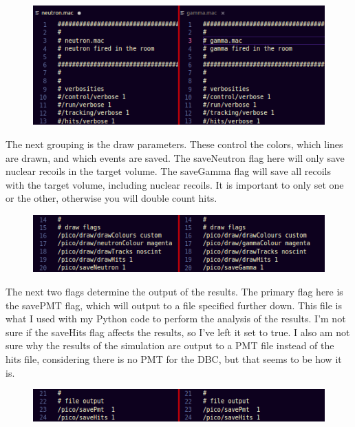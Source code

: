 \documentclass[%
12pt,
twoside,
reprint,
amsmath,amssymb,
aps,
]{article}
\begin{document}
	\begin{figure}[!h]
		\centering
		\includegraphics[scale = 1]{Images/verbosities.png}
		\caption{\label{tab:table-name}}
	\end{figure}

	\noindent The next grouping is the draw parameters. These control the colors, which lines are drawn, and which events are saved. The saveNeutron flag here will only save nuclear recoils in the target volume. The saveGamma flag will save all recoils with the target volume, including nuclear recoils. It is important to only set one or the other, otherwise you will double count hits.

	\begin{figure}[!h]
	\centering
	\includegraphics[scale = 1]{Images/draw.png}
	\caption{\label{tab:table-name}}
	\end{figure}
	\pagebreak
	\noindent The next two flags determine the output of the results. The primary flag here is the savePMT flag, which will output to a file specified further down. This file is what I used with my Python code to perform the analysis of the results. I'm not sure if the saveHits flag affects the results, so I've left it set to true. I also am not sure why the results of the simulation are output to a PMT file instead of the hits file, considering there is no PMT for the DBC, but that seems to be how it is.

	\begin{figure}[!h]
		\centering
		\includegraphics[scale = 1]{Images/file.png}
		\caption{\label{tab:table-name}}
	\end{figure}
\end{document}
